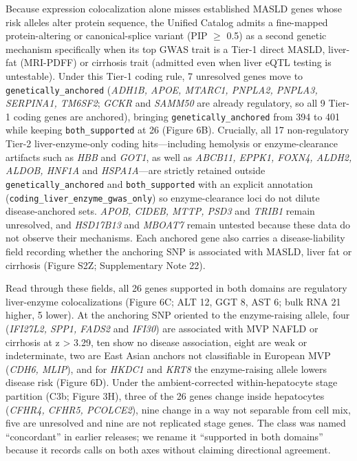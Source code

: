 Because expression colocalization alone misses established MASLD genes whose risk alleles alter protein sequence, the Unified Catalog admits a fine-mapped protein-altering or canonical-splice variant (PIP $\ge$ 0.5) as a second genetic mechanism specifically when its top GWAS trait is a Tier-1 direct MASLD, liver-fat (MRI-PDFF) or cirrhosis trait (admitted even when liver eQTL testing is untestable). Under this Tier-1 coding rule, 7 unresolved genes move to \texttt{genetically\_anchored} (\emph{ADH1B, APOE, MTARC1, PNPLA2, PNPLA3, SERPINA1, TM6SF2}; \emph{GCKR} and \emph{SAMM50} are already regulatory, so all 9 Tier-1 coding genes are anchored), bringing \texttt{genetically\_anchored} from 394 to 401 while keeping \texttt{both\_supported} at 26 (Figure 6B). Crucially, all 17 non-regulatory Tier-2 liver-enzyme-only coding hits---including hemolysis or enzyme-clearance artifacts such as \emph{HBB} and \emph{GOT1}, as well as \emph{ABCB11, EPPK1, FOXN4, ALDH2, ALDOB, HNF1A} and \emph{HSPA1A}---are strictly retained outside \texttt{genetically\_anchored} and \texttt{both\_supported} with an explicit annotation (\texttt{coding\_liver\_enzyme\_gwas\_only}) so enzyme-clearance loci do not dilute disease-anchored sets. \emph{APOB, CIDEB, MTTP, PSD3} and \emph{TRIB1} remain unresolved, and \emph{HSD17B13} and \emph{MBOAT7} remain untested because these data do not observe their mechanisms. Each anchored gene also carries a disease-liability field recording whether the anchoring SNP is associated with MASLD, liver fat or cirrhosis (Figure S2Z; Supplementary Note 22).

Read through these fields, all 26 genes supported in both domains are regulatory liver-enzyme colocalizations (Figure 6C; ALT 12, GGT 8, AST 6; bulk RNA 21 higher, 5 lower). At the anchoring SNP oriented to the enzyme-raising allele, four (\emph{IFI27L2, SPP1, FADS2} and \emph{IFI30}) are associated with MVP NAFLD or cirrhosis at \textbar z\textbar{} \textgreater{} 3.29, ten show no disease association, eight are weak or indeterminate, two are East Asian anchors not classifiable in European MVP (\emph{CDH6, MLIP}), and for \emph{HKDC1} and \emph{KRT8} the enzyme-raising allele lowers disease risk (Figure 6D). Under the ambient-corrected within-hepatocyte stage partition (C3b; Figure 3H), three of the 26 genes change inside hepatocytes (\emph{CFHR4, CFHR5, PCOLCE2}), nine change in a way not separable from cell mix, five are unresolved and nine are not replicated stage genes. The class was named ``concordant'' in earlier releases; we rename it ``supported in both domains'' because it records calls on both axes without claiming directional agreement.

